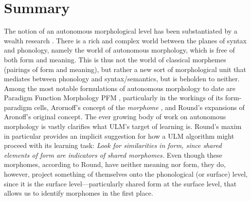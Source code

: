 \section{Summary}\label{sum}
The notion of an autonomous morphological level
has been substantiated by a wealth research \citep[including, e.g.,][]{stump:2001, aronoff:1994, round:2011, round:2015}.
There is a rich and complex 
world between the planes of syntax and phonology, namely the world of autonomous morphology, which is free of both form and meaning. This is thus not the world of classical morphemes (pairings of form and meaning), but rather a new sort of morphological unit that mediates between phonology and
syntax/semantics, but is beholden to neither.  
Among the most notable formulations of autonomous morphology to date are Paradigm Function Morphology \ac{PFM} \citep{stump:2001}, particularly in the workings of its form-paradigm cells, Arornoff's
concept of the \emph{morphome} \citep{aronoff:1994}, and Round's expansions \citep[e.g.,][]{2011,2015,2016} of Aronoff's original concept. The ever growing body of work on autonomous morphology is vastly clarifies what \ac{ULM}'s target of learning is. Round's maxim in particular provides an implicit suggestion for how a \ac{ULM} algorithm might proceed with its learning task: \textit{Look for similarities in form, since shared elements of form are indicators of shared morphomes.} Even though these morphomes, according to Round, have neither meaning nor form, they do, however, project something of themselves onto the phonological (or surface) level, since it is the surface level---particularly shared  form at the surface level, that allows us to identify morphomes in the first place. 


